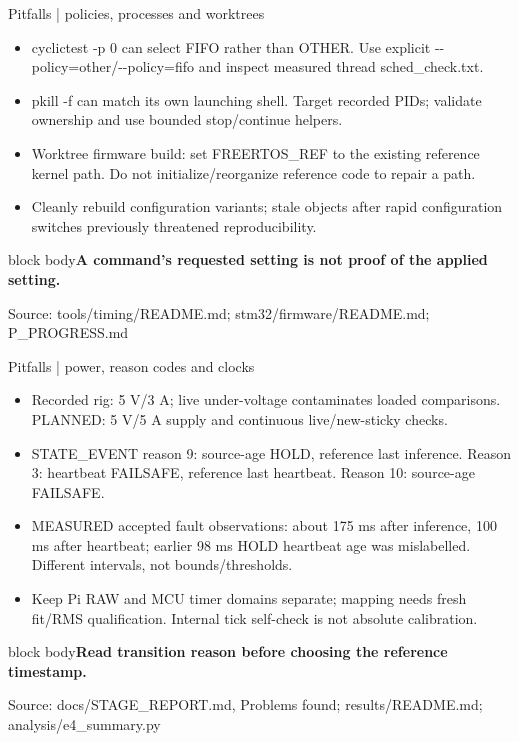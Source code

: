 \documentclass[aspectratio=169,12pt,t]{beamer}
\newcommand{\src}[1]{\par\vfill{\small\color{muted}Source: #1}}
\newcommand{\takeaway}[1]{\par\medskip\begin{beamercolorbox}[sep=2mm,wd=\linewidth]{block body}\color{navy}\textbf{#1}\end{beamercolorbox}}
\begin{document}
\begin{frame}{Pitfalls | policies, processes and worktrees}
\begin{itemize}
\item cyclictest -p 0 can select FIFO rather than OTHER. Use explicit -{}-policy=other/-{}-policy=fifo and inspect measured thread sched\_check.txt.
\item pkill -f can match its own launching shell. Target recorded PIDs; validate ownership and use bounded stop/continue helpers.
\item Worktree firmware build: set FREERTOS\_REF to the existing reference kernel path. Do not initialize/reorganize reference code to repair a path.
\item Cleanly rebuild configuration variants; stale objects after rapid configuration switches previously threatened reproducibility.
\end{itemize}
\takeaway{A command’s requested setting is not proof of the applied setting.}\src{tools/timing/README.md; stm32/firmware/README.md; P\_PROGRESS.md}
\end{frame}
\begin{frame}{Pitfalls | power, reason codes and clocks}
\begin{itemize}
\item Recorded rig: 5 V/3 A; live under-voltage contaminates loaded comparisons. PLANNED: 5 V/5 A supply and continuous live/new-sticky checks.
\item STATE\_EVENT reason 9: source-age HOLD, reference last inference. Reason 3: heartbeat FAILSAFE, reference last heartbeat. Reason 10: source-age FAILSAFE.
\item MEASURED accepted fault observations: about 175 ms after inference, 100 ms after heartbeat; earlier 98 ms HOLD heartbeat age was mislabelled. Different intervals, not bounds/thresholds.
\item Keep Pi RAW and MCU timer domains separate; mapping needs fresh fit/RMS qualification. Internal tick self-check is not absolute calibration.
\end{itemize}
\takeaway{Read transition reason before choosing the reference timestamp.}\src{docs/STAGE\_REPORT.md, Problems found; results/README.md; analysis/e4\_summary.py}
\end{frame}
\end{document}

